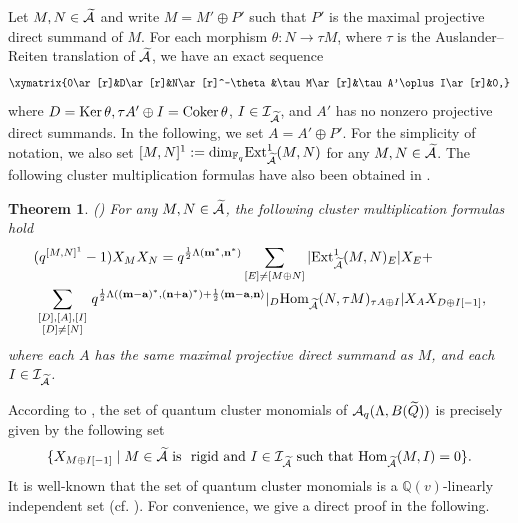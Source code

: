 \documentclass[reqno,12pt]{amsart}
\numberwithin{equation}{section}
\def\Ext{\mbox{\rm Ext}} \def\Hom{\mbox{\rm Hom}} \def\dim{\mbox{\rm dim}} \def\Iso{\mbox{\rm Iso}\,}\def\Ind{\mbox{\rm Ind}\,}
\def\lr#1{\langle #1\rangle} \def\fin{\hfill$\square$}  \def\lra{\longrightarrow} \def\mod{\mbox{\rm \textbf{mod}}\,}\def\Mod{\mbox{\rm mod}\,}\def\top{\mbox{\rm top}\,}\def\soc{\mbox{\rm soc}\,}
\def\Ker{\mbox{\rm Ker}\,}   \def\im{\mbox{\rm Im}\,} \def\Coker{\mbox{\rm Coker}\,}
\theoremstyle{plain} %
\newtheorem{theorem}{\bf Theorem}[section]
\theoremstyle{definition} %
\begin{document}
Let $M,N\in\widetilde{\mathcal{A}}$ and write $M=M'\oplus P'$ such that $P'$ is the maximal projective direct summand of $M$. For each morphism $\theta:N\longrightarrow \tau M$, where $\tau$ is the Auslander--Reiten translation of $\widetilde{\mathcal{A}}$, we have an exact sequence
\begin{equation}\label{zhxl}
\xymatrix{0\ar[r]&D\ar[r]&N\ar[r]^-\theta&\tau M\ar[r]&\tau A'\oplus I\ar[r]&0,}
\end{equation}where $D=\Ker \theta, \tau A'\oplus I=\Coker \theta$, $I\in\mathcal{I}_{\widetilde{\mathcal{A}}}$, and $A'$ has no nonzero projective direct summands. In the following, we set $A=A'\oplus P'$.
For the simplicity of notation, we also set $[M,N]^1:={\rm dim}_{\mathbb{F}_q}\Ext^1_{\widetilde{\A}}(M,N)$ for any $M,N\in\widetilde{\mathcal{A}}$.
The following cluster multiplication formulas have also been obtained in \cite{CDZ}.
\begin{theorem}\textup{(\cite[Theorem 7.4]{CDZ})}
For any $M,N\in\widetilde{\mathcal{A}}$, the following cluster multiplication formulas hold
\begin{equation}\label{ccfgs}
\begin{split}
&(q^{[M,N]^1}-1)X_M X_N=q^{\frac{1}{2}\Lambda({\bf m}^*,{\bf n}^*)}\sum\limits_{[E]\neq [M\oplus N]}
|\Ext_{\widetilde{\A}}^1(M,N)_E|X_E+\\&\sum\limits_{\begin{smallmatrix}[D],[A],[I]\\ [D]\neq [N]\end{smallmatrix}}q^{\frac{1}{2}\Lambda(({\bf m}-{{\bf a}})^*,{({\bf n}+{\bf a})}^*)+\frac{1}{2}\lr{{{\bf m}}-{{\bf a}},{\bf n}}}|_D\Hom_{\widetilde{\A}}(N,\tau M)_{\tau A\oplus I}|X_{A} X_{D\oplus I[-1]},
\end{split}\end{equation}
where each $A$ has the same maximal projective direct summand as $M$, and each $I\in\mathcal{I}_{\widetilde{\mathcal{A}}}$.
\end{theorem}

According to \cite{Rupel2}, the set of quantum cluster monomials of $\mathcal{A}_q(\Lambda, B(\widetilde{Q}))$ is precisely given by the following set \begin{equation}\label{qclumo}
\{X_{M\oplus I[-1]}\mid M\in \widetilde{\A}~\text{is ~rigid~and}~I\in \mathcal{I}_{\widetilde{\A}}~\text{such that}~ \Hom_{\widetilde{\A}}(M,I)=0\}.\end{equation}
It is well-known that the set of quantum cluster monomials is a $\mathbb{Q}(v)$-linearly independent set (cf. \cite{BZ12, KQin}). For convenience, we give a direct proof in the following.
\end{document}

